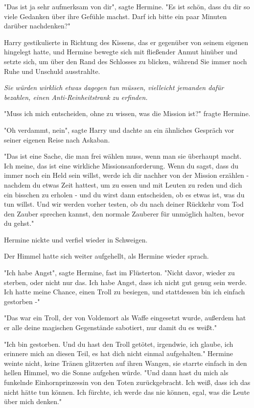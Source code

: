 {"Das ist ja sehr aufmerksam von dir", sagte Hermine. "Es ist schön, dass du dir so viele Gedanken über ihre Gefühle machst. Darf ich bitte ein paar Minuten darüber nachdenken?"

Harry gestikulierte in Richtung des Kissens, das er gegenüber von seinem eigenen hingelegt hatte, und Hermine bewegte sich mit fließender Anmut hinüber und setzte sich, um über den Rand des Schlosses zu blicken, während Sie immer noch Ruhe und Unschuld ausstrahlte.

\emph{Sie würden wirklich etwas dagegen tun müssen, vielleicht jemanden dafür bezahlen, einen Anti-Reinheitstrank zu erfinden.}

"Muss ich mich entscheiden, ohne zu wissen, was die Mission ist?" fragte Hermine.

"Oh verdammt, nein", sagte Harry und dachte an ein ähnliches Gespräch vor seiner eigenen Reise nach Askaban.

"Das ist eine Sache, die man frei wählen muss, wenn man sie überhaupt macht. Ich meine, das ist eine wirkliche Missionsanforderung. Wenn du sagst, dass du immer noch ein Held sein willst, werde ich dir nachher von der Mission erzählen - nachdem du etwas Zeit hattest, um zu essen und mit Leuten zu reden und dich ein bisschen zu erholen - und du wirst dann entscheiden, ob es etwas ist, was du tun willst. Und wir werden vorher testen, ob du nach deiner Rückkehr vom Tod den Zauber sprechen kannst, den normale Zauberer für unmöglich halten, bevor du gehst."

Hermine nickte und verfiel wieder in Schweigen.

Der Himmel hatte sich weiter aufgehellt, als Hermine wieder sprach.

"Ich habe Angst", sagte Hermine, fast im Flüsterton. "Nicht davor, wieder zu sterben, oder nicht nur das. Ich habe Angst, dass ich nicht gut genug sein werde. Ich hatte meine Chance, einen Troll zu besiegen, und stattdessen bin ich einfach gestorben -"

"Das war ein Troll, der von Voldemort als Waffe eingesetzt wurde, außerdem hat er alle deine magischen Gegenstände sabotiert, nur damit du es weißt."

"Ich bin gestorben. Und du hast den Troll getötet, irgendwie, ich glaube, ich erinnere mich an diesen Teil, es hat dich nicht einmal aufgehalten." Hermine weinte nicht, keine Tränen glitzerten auf ihren Wangen, sie starrte einfach in den hellen Himmel, wo die Sonne aufgehen würde. "Und dann hast du mich als funkelnde Einhornprinzessin von den Toten zurückgebracht. Ich weiß, dass ich das nicht hätte tun können. Ich fürchte, ich werde das nie können, egal, was die Leute über mich denken."

}
